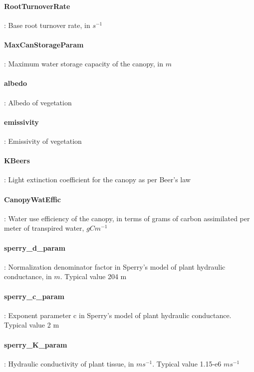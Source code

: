 \hangindent=0.7cm
\paragraph{RootTurnoverRate}: Base root turnover rate, in $s^{-1}$

\hangindent=0.7cm
\paragraph{MaxCanStorageParam}: Maximum water storage capacity of the canopy, in $m$

\hangindent=0.7cm
\paragraph{albedo}: Albedo of vegetation

\hangindent=0.7cm
\paragraph{emissivity}: Emissivity of vegetation

\hangindent=0.7cm
\paragraph{KBeers}: Light extinction coefficient for the canopy as per Beer's law

\hangindent=0.7cm
\paragraph{CanopyWatEffic}: Water use efficiency of the canopy, in terms of grams of carbon assimilated per meter of transpired water, $gCm^{-1}$

\hangindent=0.7cm
\paragraph{sperry\_d\_param}: Normalization denominator factor in Sperry's model of plant hydraulic conductance, in $m$. Typical value 204 m

\paragraph{sperry\_c\_param}: Exponent parameter c in Sperry's model of plant hydraulic conductance. Typical value 2 m

\paragraph{sperry\_K\_param}: Hydraulic conductivity of plant tissue, in $ms^{-1}$. Typical value 1.15-e6 $ms^{-1}$

